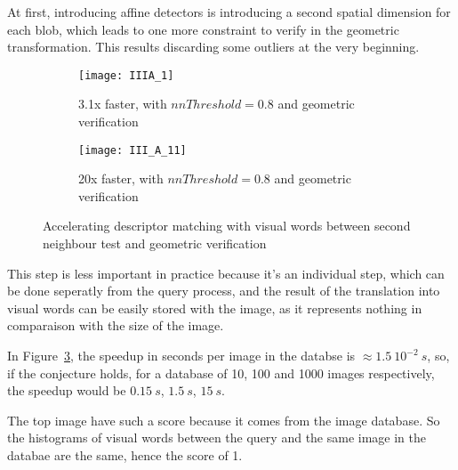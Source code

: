 \documentclass{article}
\begin{document}
At first, introducing affine detectors is introducing a second spatial dimension for each blob, which leads to one more constraint to verify in the geometric transformation. This results discarding some outliers at the very beginning.


\begin{figure}
	\begin{subfigure}[b]{0.9\textwidth}
		\centering
		\texttt{[image: IIIA\_1]}
		\caption{3.1x faster, with \( nnThreshold = 0.8\) and geometric verification}
		\label{fig:III_A1}
	\end{subfigure}

	\begin{subfigure}[b]{0.9\textwidth}
		\centering
		\texttt{[image: III\_A\_11]}
		\caption{20x faster, with \( nnThreshold = 0.8\) and geometric verification}
		\label{fig:III_A11}
	\end{subfigure}

	\caption{Accelerating descriptor matching with visual words between second neighbour test and geometric verification}
	\label{fig:III_A}
\end{figure}

This step is less important in practice because it's an individual step, which can be done seperatly from the query process, and the result of the translation into visual words can be easily stored with the image, as it represents nothing in comparaison with the size of the image.


In Figure~\ref{fig:III_A}, the speedup in seconds per image in the databse is \( \approx 1.5~10^{-2}~s\), so, if the conjecture holds, for a database of 10, 100 and 1000 images respectively, the speedup would be \(0.15~s\), \(1.5~s\), \(15~s\).


The top image have such a score because it comes from the image database. So the histograms of visual words between the query and the same image in the databae are the same, hence the score of 1.
\end{document}
